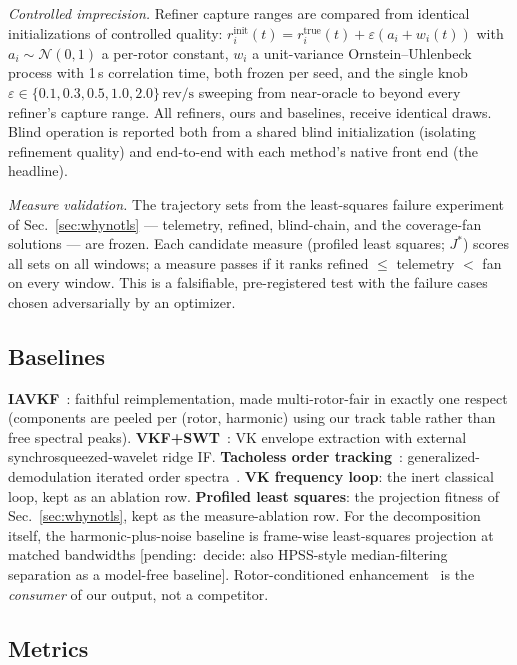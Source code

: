 \documentclass[journal]{IEEEtran}
\newcommand{\revps}{\ensuremath{\,\mathrm{rev/s}}}
\newcommand{\Jobj}{\ensuremath{J}}
\newcommand{\pending}[1]{{\color{gray}\textsf{[pending:~#1]}}}
\begin{document}
\emph{Controlled imprecision.} Refiner capture ranges are compared from
identical initializations of controlled quality:
$r^{\mathrm{init}}_i(t) = r^{\mathrm{true}}_i(t) + \varepsilon (a_i +
w_i(t))$ with $a_i \sim \mathcal{N}(0,1)$ a per-rotor constant, $w_i$ a
unit-variance Ornstein--Uhlenbeck process with 1\,s correlation time,
both frozen per seed, and the single knob $\varepsilon \in \{0.1, 0.3,
0.5, 1.0, 2.0\}\revps$ sweeping from near-oracle to beyond every
refiner's capture range. All refiners, ours and baselines, receive
identical draws. Blind operation is reported both from a shared blind
initialization (isolating refinement quality) and end-to-end with each
method's native front end (the headline).

\emph{Measure validation.} The trajectory sets from the least-squares
failure experiment of Sec.~\ref{sec:whynotls} --- telemetry, refined,
blind-chain, and the coverage-fan solutions --- are frozen. Each
candidate measure (profiled least squares; $\Jobj^\ast$) scores all sets
on all windows; a measure passes if it ranks refined $\le$ telemetry $<$
fan on every window. This is a falsifiable, pre-registered test with the
failure cases chosen adversarially by an optimizer.

\subsection{Baselines}
\textbf{IAVKF}~\cite{jiang2024iavkf}: faithful reimplementation, made
multi-rotor-fair in exactly one respect (components are peeled per
(rotor, harmonic) using our track table rather than free spectral
peaks). \textbf{VKF+SWT}~\cite{li2020vkswt}: VK envelope extraction with
external synchrosqueezed-wavelet ridge IF. \textbf{Tacholess order
tracking}~\cite{peeters2019tacholess}: generalized-demodulation iterated
order spectra~\cite{olhede2005generalized}. \textbf{VK frequency loop}:
the inert classical loop, kept as an ablation row. \textbf{Profiled
least squares}: the projection fitness of Sec.~\ref{sec:whynotls}, kept
as the measure-ablation row. For the decomposition itself, the
harmonic-plus-noise baseline is frame-wise least-squares projection at
matched bandwidths \pending{decide: also HPSS-style median-filtering
separation as a model-free baseline}. Rotor-conditioned
enhancement~\cite{gulli2025rotorcond} is the \emph{consumer} of our
output, not a competitor.

\subsection{Metrics}
\label{sec:metrics}
\end{document}
